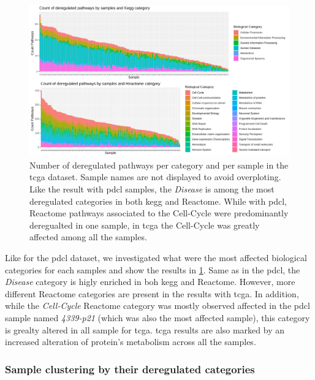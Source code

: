 \begin{figure}
    \includegraphics[width=\textwidth]{img/barplot-categ-tcga}
    \caption{
        Number of deregulated pathways per category and per sample in the \acrshort{tcga} dataset.
        Sample names are not displayed to avoid overploting.
        Like the result with \acrshort{pdcl} samples, the \textit{Disease} is among the most deregulated categories in both \acrshort{kegg} and Reactome.
        While with \acrshort{pdcl}, Reactome pathways associated to the Cell-Cycle were predominantly deregualted in one sample, in \acrshort{tcga} the Cell-Cycle was greatly affected among all the samples.
    }
    \label{fig:barplot-categ-tcga}
\end{figure}

Like for the \acrshort{pdcl} dataset, we investigated what were the most affected biological categories for each samples and show the results in \ref*{fig:barplot-categ-tcga}.
Same as in the \acrshort{pdcl}, the \textit{Disease} category is higly enriched in boh \acrshort{kegg} and Reactome.
However, more different Reactome categories are present in the results with \acrshort{tcga}.
In addition, while the \textit{Cell-Cycle} Reactome category was mostly observed affected in the \acrshort{pdcl} sample named \textit{4339-p21} (which was also the most affected sample), this category is grealty altered in all sample for \acrshort{tcga}.
\acrshort{tcga} results are also marked by an increased alteration of protein's metabolism across all the samples.

\subsubsection{Sample clustering by their deregulated categories}

